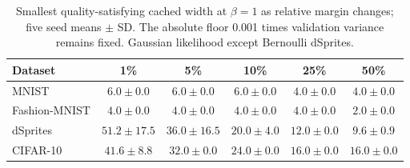 \begin{table}[H]
\caption{Smallest quality-satisfying cached width at $\beta=1$ as relative margin changes; five seed means $\pm$ SD. The absolute floor 0.001 times validation variance remains fixed. Gaussian likelihood except Bernoulli dSprites.}\label{tab:margin}
\footnotesize
\setlength{\tabcolsep}{3.5pt}
\begin{tabular*}{\textwidth}{@{\extracolsep{\fill}}lccccc@{}}
\toprule
Dataset & 1\% & 5\% & 10\% & 25\% & 50\% \\
\midrule
MNIST & $6.0 \pm 0.0$ & $6.0 \pm 0.0$ & $6.0 \pm 0.0$ & $4.0 \pm 0.0$ & $4.0 \pm 0.0$ \\
Fashion-MNIST & $4.0 \pm 0.0$ & $4.0 \pm 0.0$ & $4.0 \pm 0.0$ & $4.0 \pm 0.0$ & $2.0 \pm 0.0$ \\
dSprites & $51.2 \pm 17.5$ & $36.0 \pm 16.5$ & $20.0 \pm 4.0$ & $12.0 \pm 0.0$ & $9.6 \pm 0.9$ \\
CIFAR-10 & $41.6 \pm 8.8$ & $32.0 \pm 0.0$ & $24.0 \pm 0.0$ & $16.0 \pm 0.0$ & $16.0 \pm 0.0$ \\
\bottomrule
\end{tabular*}
\end{table}
